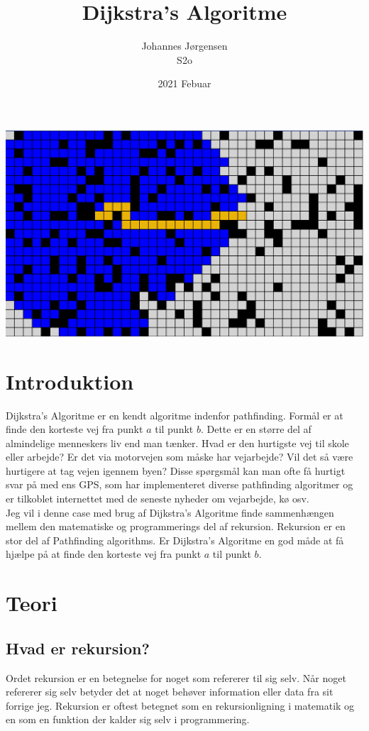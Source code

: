 \documentclass[12pt]{article}
\begin{document}
\title{Dijkstra's Algoritme}
\author{Johannes Jørgensen\\ S2o}
\date{2021 Febuar}
\maketitle
\includegraphics[width=\textwidth]{viz3.png}

\pagebreak
\tableofcontents
\pagebreak

\section{Introduktion}
Dijkstra's Algoritme er en kendt algoritme indenfor pathfinding. Formål er at finde den korteste vej fra punkt $a$ til punkt $b$. Dette er en større del af almindelige menneskers liv end man tænker. Hvad er den hurtigste vej til skole eller arbejde? Er det via motorvejen som måske har vejarbejde? Vil det så være hurtigere at tag vejen igennem byen? Disse spørgsmål kan man ofte få hurtigt svar på med ens GPS, som har implementeret diverse pathfinding algoritmer og er tilkoblet internettet med de seneste nyheder om vejarbejde, kø osv. 
\\Jeg vil i denne case med brug af Dijkstra's Algoritme finde sammenhængen mellem den matematiske og programmerings del af rekursion. Rekursion er en stor del af Pathfinding algorithms. Er Dijkstra's Algoritme en god måde at få hjælpe på at finde den korteste vej fra punkt $a$ til punkt $b$.
\section{Teori}

\subsection{Hvad er rekursion?}
Ordet rekursion er en betegnelse for noget som refererer til sig selv. Når noget refererer sig selv betyder det at noget behøver information eller data fra sit forrige jeg. 
Rekursion er oftest betegnet som en rekursionligning i matematik og en som en funktion der kalder sig selv i programmering. 
\end{document}
